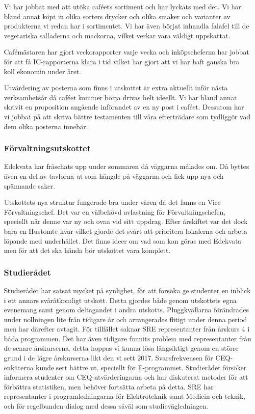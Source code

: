 \documentclass[../_main/handlingar.tex]{subfiles}
\begin{document}
Vi har jobbat med att utöka caféets sortiment och har lyckats med det. Vi har bland annat köpt in olika sorters drycker och olika smaker och varianter av produkterna vi redan har i sortimentet. Vi har även börjat inhandla falafel till de vegetariska salladerna och mackorna, vilket verkar vara väldigt uppskattat.

Cafémästaren har gjort veckorapporter varje vecka och inköpscheferna har jobbat för att få IC-rapporterna klara i tid vilket har gjort att vi har haft ganska bra koll ekonomin under året.

Utvärdering av posterna som finns i utskottet är extra aktuellt inför nästa verksamhetsår då caféet kommer börja drivas helt ideellt. Vi har bland annat skrivit en proposition angående införandet av en ny post i caféet. Dessutom har vi jobbat på att skriva bättre testamenten till våra efterträdare som tydliggör vad dem olika posterna innebär.

\subsubsection*{Förvaltningsutskottet}
Edekvata har fräschats upp under sommaren då väggarna målades om. Då byttes även en del av tavlorna ut som hängde på väggarna och fick upp nya och spännande saker.

Utskottets nya struktur fungerade bra under våren då det fanns en Vice Förvaltningschef. Det var en välbehövd avlastning för Förvaltningschefen, speciellt när denne var ny och ovan vid sitt uppdrag. Efter årskiftet var det dock bara en Hustomte kvar vilket gjorde det svårt att prioritera lokalerna och arbeta löpande med underhållet. Det finns ideer om vad som kan göras med Edekvata men för att det ska hända bör utskottet vara komplett.

\subsubsection*{Studierådet}
Studierådet har satsat mycket på synlighet, för att försöka ge studenter en inblick i ett annars svåråtkomligt utskott. Detta gjordes både genom utskottets egna evenemang samt genom deltagandet i andra utskotts. Pluggkvällarna förändrades under nollningen lite från tidigare år och arrangerades flitigt under denna period men har därefter avtagit. För tillfället saknar SRE representanter från årskurs 4 i båda programmen. Det har även tidigare funnits problem med representanter från de senare årskurserna, detta hoppas vi kunna lösa långsiktigt genom en större grund i de lägre årskurserna likt den vi sett 2017. Svarsfrekvensen för CEQ-enkäterna kunde sett bättre ut, speciellt för E-programmet. Studierådet försöker informera studenter om CEQ-utvärderingarna och har diskuterat metoder för att förbättra statistiken, men behöver fortsätta arbeta på detta. SRE har representanter i programledningarna för Elektroteknik samt Medicin och teknik, och för regelbunden dialog med dessa såväl som studievägledningen.
\end{document}
